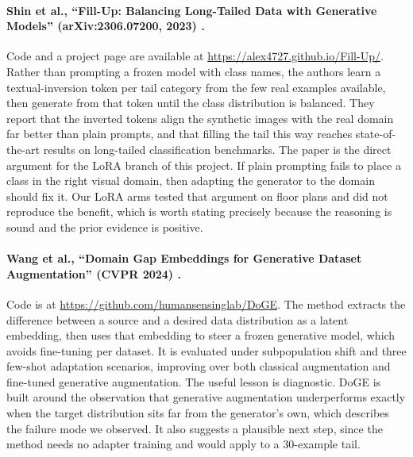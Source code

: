 \paragraph{Shin et al., ``Fill-Up: Balancing Long-Tailed Data with Generative
Models'' (arXiv:2306.07200, 2023) \cite{shin2023fillup}.} Code and a project
page are available at \url{https://alex4727.github.io/Fill-Up/}. Rather than
prompting a frozen model with class names, the authors learn a
textual-inversion token per tail category from the few real examples available,
then generate from that token until the class distribution is balanced. They
report that the inverted tokens align the synthetic images with the real domain
far better than plain prompts, and that filling the tail this way reaches
state-of-the-art results on long-tailed classification benchmarks. The paper is
the direct argument for the LoRA branch of this project. If plain prompting
fails to place a class in the right visual domain, then adapting the generator
to the domain should fix it. Our LoRA arms tested that argument on floor plans
and did not reproduce the benefit, which is worth stating precisely because the
reasoning is sound and the prior evidence is positive.

\paragraph{Wang et al., ``Domain Gap Embeddings for Generative Dataset
Augmentation'' (CVPR 2024) \cite{wang2024doge}.} Code is at
\url{https://github.com/humansensinglab/DoGE}. The method extracts the
difference between a source and a desired data distribution as a latent
embedding, then uses that embedding to steer a frozen generative model, which
avoids fine-tuning per dataset. It is evaluated under subpopulation shift and
three few-shot adaptation scenarios, improving over both classical augmentation
and fine-tuned generative augmentation. The useful lesson is diagnostic. DoGE is
built around the observation that generative augmentation underperforms exactly
when the target distribution sits far from the generator's own, which describes
the failure mode we observed. It also suggests a plausible next step, since the
method needs no adapter training and would apply to a 30-example tail.

